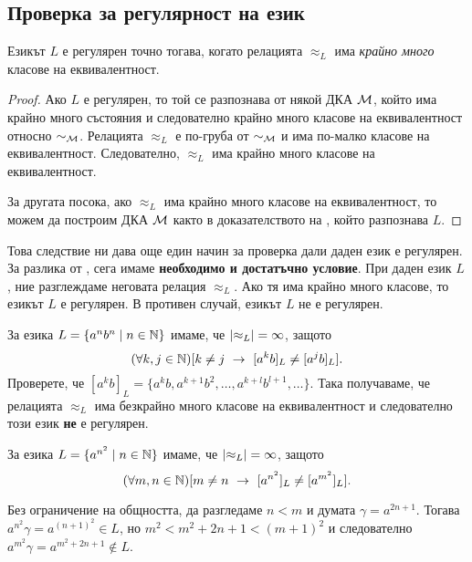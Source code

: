 \subsection{Проверка за регулярност на език}

\begin{framed}
  \begin{cor}
    Езикът $L$ е регулярен точно тогава, когато релацията $\approx_L$ има {\em крайно много} класове на еквивалентност.
  \end{cor}
\end{framed}
\begin{proof}
  Ако $L$ е регулярен, то той се разпознава от някой ДКА $\mathcal{M}$, който има крайно много състояния 
  и следователно крайно много класове на еквивалентност относно $\sim_{\mathcal{M}}$.
  Релацията $\approx_L$ е по-груба от $\sim_{\mathcal{M}}$ и има по-малко класове на еквивалентност.
  Следователно, $\approx_L$ има крайно много класове на еквивалентност.
  
  За другата посока, ако $\approx_L$ има крайно много класове на еквивалентност, то можем да 
  построим ДКА $\mathcal{M}$ както в доказателството на , който разпознава $L$.
\end{proof}

Това следствие ни дава още един начин за проверка дали даден език е регулярен.
За разлика от , сега имаме {\bf необходимо и достатъчно условие}.
При даден език $L$, ние разглеждаме неговата релация $\approx_L$.
Ако тя има крайно много класове, то езикът $L$ е регулярен.
В противен случай, езикът $L$ не е регулярен.

\begin{example}
  За езика $L = \{a^nb^n\mid n \in \mathbb{N}\}$ имаме, че $\lvert{\approx_L}\rvert = \infty$,
  защото \[(\forall k,j\in\mathbb{N})[k \neq j\ \rightarrow\ [a^kb]_L \neq [a^jb]_L].\]
  Проверете, че $[a^kb]_L = \{a^kb,a^{k+1}b^{2},\dots,a^{k+l}b^{l+1},\dots\}$.
  Така получаваме, че релацията $\approx_L$ има безкрайно много класове на еквивалентност
  и следователно този език {\bf не} е регулярен.
\end{example}

\begin{example}
  За езика $L = \{a^{n^2} \mid n \in \mathbb{N}\}$ имаме, че $\lvert{\approx_L}\rvert = \infty$,
  защото \[(\forall m,n\in\mathbb{N})[m \neq n\ \rightarrow\ [a^{n^2}]_L \neq [a^{m^2}]_L].\]
  
  Без ограничение на общността, да разгледаме $n < m$ и думата $\gamma = a^{2n+1}$.
  Тогава $a^{n^2}\gamma = a^{(n+1)^2} \in L$, но 
  $m^2 < m^2 + 2n + 1 < (m+1)^2$ и следователно $a^{m^2}\gamma = a^{m^2+2n+1}\not\in L$.
\end{example}

